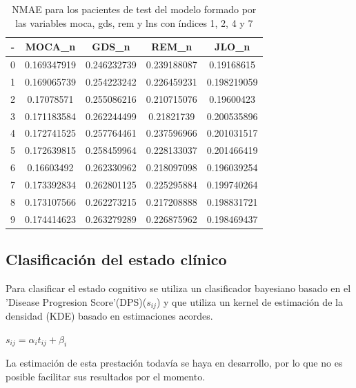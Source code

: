 \begin{table}[htbp]
	\centering
	\begin{tabular}{|c|c|c|c|c|}
		\hline
		-& MOCA\_n & GDS\_n & REM\_n & JLO\_n \\
		\hline
		0 & 0.169347919 & 0.246232739 & 0.239188087 & 0.19168615 \\
		1 & 0.169065739 & 0.254223242 & 0.226459231 & 0.198219059 \\
		2 & 0.17078571 & 0.255086216 & 0.210715076 & 0.19600423 \\
		3 & 0.171183584 & 0.262244499 & 0.21821739 & 0.200535896 \\
		4 & 0.172741525 & 0.257764461 & 0.237596966 & 0.201031517 \\
		5 & 0.172639815 & 0.258459964 & 0.228133037 & 0.201466419 \\
		6 & 0.16603492 & 0.262330962 & 0.218097098 & 0.196039254 \\
		7 & 0.173392834 & 0.262801125 & 0.225295884 & 0.199740264 \\
		8 & 0.173107566 & 0.262273215 & 0.217208888 & 0.198831721 \\
		9 & 0.174414623 & 0.263279289 & 0.226875962 & 0.198469437 \\
		\hline
	\end{tabular}
	\caption{NMAE para los pacientes de test del modelo formado por las variables moca, gds, rem y lns con índices 1, 2, 4 y 7}
	\label{tab:NMAE test}
\end{table}

\subsection{Clasificación del estado clínico}
Para clasificar el estado cognitivo se utiliza  un clasificador bayesiano basado en el 'Disease Progresion Score'(DPS)($s_{ij}$) y que utiliza un kernel de estimación de la densidad (KDE) basado en estimaciones acordes.
\begin{center}
	$s_{ij}=\alpha_{i}t_{ij}+\beta_{i}$
\end{center}

La estimación de esta prestación todavía se haya en desarrollo, por lo que no es posible facilitar sus resultados por el momento. 


